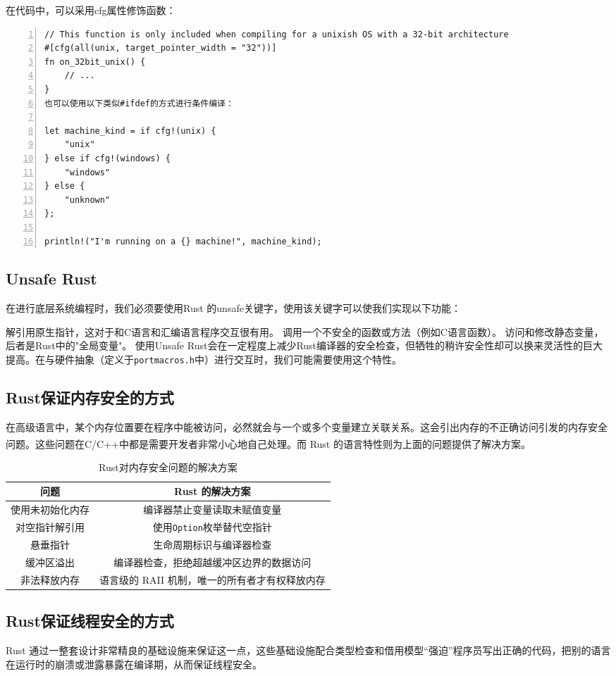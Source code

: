 \documentclass[UTF8,fontset=none,linespread=1.15]{ctexart}
\let\nosupcite\cite
\renewcommand*{\cite}[1]{\textsuperscript{\nosupcite{#1}}}
\begin{document}
在代码中，可以采用cfg属性修饰函数：
\begin{lstlisting}[numbers=left]
// This function is only included when compiling for a unixish OS with a 32-bit architecture
#[cfg(all(unix, target_pointer_width = "32"))]
fn on_32bit_unix() {
	// ...
}
也可以使用以下类似#ifdef的方式进行条件编译：

let machine_kind = if cfg!(unix) {
	"unix"
} else if cfg!(windows) {
	"windows"
} else {
	"unknown"
};

println!("I'm running on a {} machine!", machine_kind);
\end{lstlisting}
\cite{e}
\subsection{Unsafe Rust}
在进行底层系统编程时，我们必须要使用Rust 的unsafe关键字，使用该关键字可以使我们实现以下功能：

解引用原生指针，这对于和C语言和汇编语言程序交互很有用。
调用一个不安全的函数或方法（例如C语言函数）。
访问和修改静态变量，后者是Rust中的"全局变量"。
使用Unsafe Rust会在一定程度上减少Rust编译器的安全检查，但牺牲的稍许安全性却可以换来灵活性的巨大提高。在与硬件抽象（定义于\texttt{portmacros.h}中）进行交互时，我们可能需要使用这个特性。
\subsection{Rust保证内存安全的方式}
在高级语言中，某个内存位置要在程序中能被访问，必然就会与一个或多个变量建立关联关系。这会引出内存的不正确访问引发的内存安全问题。这些问题在C/C++中都是需要开发者非常小心地自己处理。而 Rust 的语言特性则为上面的问题提供了解决方案。\cite{8}
\begin{table}[H]
\centering
\caption{Rust对内存安全问题的解决方案}
\begin{tabular}{|c|c|}
\hline
\textbf{问题} & \textbf{Rust 的解决方案}\\\hline
使用未初始化内存&编译器禁止变量读取未赋值变量\\\hline
对空指针解引用&使用\texttt{Option}枚举替代空指针\\\hline
悬垂指针&生命周期标识与编译器检查\\\hline
缓冲区溢出&编译器检查，拒绝超越缓冲区边界的数据访问\\\hline
非法释放内存&语言级的 RAII 机制，唯一的所有者才有权释放内存\\\hline
\end{tabular}
\end{table}
\subsection{Rust保证线程安全的方式}
Rust 通过一整套设计非常精良的基础设施来保证这一点，这些基础设施配合类型检查和借用模型“强迫”程序员写出正确的代码，把别的语言在运行时的崩溃或泄露暴露在编译期，从而保证线程安全。
\end{document}
